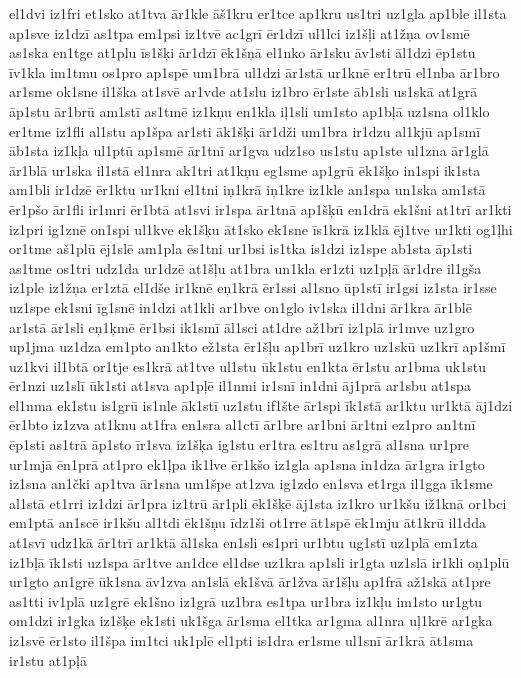 {el1dvi
iz1fri
et1sko
at1tva
ār1kle
āš1kru
er1tce
ap1kru
us1tri
uz1gla
ap1ble
il1sta
ap1sve
iz1dzī
as1tpa
em1psi
iz1tvē
ac1grī
ēr1dzī
ul1lci
iz1šļi
at1žņa
ov1smē
as1ska
en1tge
at1plu
īs1šķi
ār1dzī
ēk1šņā
el1nko
ār1sku
āv1sti
āl1dzi
ēp1stu
īv1kla
im1tmu
os1pro
ap1spē
um1brā
ul1dzi
ār1stā
ur1knē
er1trū
el1nba
ār1bro
ar1sme
ok1sne
il1ška
at1svē
ar1vde
at1slu
iz1bro
ēr1ste
āb1sli
us1skā
at1grā
āp1stu
ār1brū
am1stī
as1tmē
iz1kņu
en1kla
iļ1sli
um1sto
ap1bļā
uz1sna
ol1klo
er1tme
iz1fli
al1stu
ap1špa
ar1sti
āk1šķi
ār1dži
um1bra
ir1dzu
al1kjū
ap1smī
āb1sta
iz1kļa
ul1ptū
ap1smē
ār1tnī
ar1gva
udz1so
us1stu
ap1ste
ul1zna
ār1glā
ār1blā
ur1ska
il1stā
el1nra
ak1tri
at1kņu
eg1sme
ap1grū
ēk1šķo
in1spi
ik1sta
am1bli
ir1dzē
ēr1ktu
ur1kni
el1tni
iņ1krā
iņ1kre
iz1kle
an1spa
un1ska
am1stā
ēr1pšo
ār1fli
ir1mri
ēr1btā
at1svi
ir1spa
ār1tnā
ap1šķū
en1drā
ek1šni
at1trī
ar1kti
iz1pri
ig1znē
on1spi
ul1kve
ek1šķu
āt1sko
ek1sne
īs1krā
iz1klā
ēj1tve
ur1kti
og1ļhi
or1tme
aš1plū
ēj1slē
am1pla
ēs1tni
ur1bsi
is1tka
is1dzi
iz1spe
ab1sta
āp1sti
as1tme
os1tri
udz1da
ur1dzē
at1šļu
at1bra
un1kla
er1zti
uz1pļā
ār1dre
il1gša
iz1ple
iz1žņa
er1ztā
el1dše
ir1knē
eņ1krā
ēr1ssi
al1sno
ūp1stī
ir1gsi
iz1sta
ir1sse
uz1spe
ek1sni
īg1snē
in1dzi
at1kli
ar1bve
on1glo
iv1ska
il1dni
ār1kra
ār1blē
ar1stā
ār1sli
eņ1ķmē
ēr1bsi
ik1smī
āl1sci
at1dre
až1brī
iz1plā
ir1mve
uz1gro
up1jma
uz1dza
em1pto
an1kto
ež1sta
ēr1šļu
ap1brī
uz1kro
uz1skū
uz1krī
ap1šmī
uz1kvi
il1btā
or1tje
es1krā
at1tve
ul1stu
ūk1stu
en1kta
ēr1stu
ar1bma
uk1stu
ēr1nzi
uz1slī
ūk1sti
at1sva
ap1pļē
il1nmi
ir1snī
in1dni
āj1prā
ar1sbu
at1spa
el1nma
ek1stu
is1grū
is1nle
āk1stī
uz1stu
if1šte
ār1spi
īk1stā
ar1ktu
ur1ktā
āj1dzi
ēr1bto
iz1zva
at1knu
at1fra
en1sra
al1ctī
ār1bre
ar1bni
ār1tni
ez1pro
an1tnī
ēp1sti
as1trā
āp1sto
īr1sva
iz1šķa
ig1stu
er1tra
es1tru
as1grā
al1sna
ur1pre
ur1mjā
ēn1prā
at1pro
ek1ļpa
ik1lve
ēr1kšo
iz1gla
ap1sna
in1dza
ār1gra
ir1gto
iz1sna
an1čki
ap1tva
ār1sna
um1špe
at1zva
ig1zdo
en1sva
et1rga
il1gga
īk1sme
al1stā
et1rri
iz1dzi
ār1pra
iz1trū
ār1pli
ēk1šķē
āj1sta
iz1kro
ur1kšu
iž1knā
or1bci
em1ptā
an1scē
ir1kšu
al1tdi
ēk1šņu
īdz1ši
ot1rre
āt1spē
ēk1mju
āt1krū
il1dda
at1svī
udz1kā
ār1trī
ar1ktā
āl1ska
en1sli
es1pri
ur1btu
ug1stī
uz1plā
em1zta
iz1bļā
īk1sti
uz1spa
ār1tve
an1dce
el1dse
uz1kra
ap1sli
ir1gta
uz1slā
ir1kli
oņ1plū
ur1gto
an1grē
ūk1sna
āv1zva
an1slā
ek1švā
ār1žva
ār1šļu
ap1frā
až1skā
at1pre
as1tti
iv1plā
uz1grē
ek1šno
iz1grā
uz1bra
es1tpa
ur1bra
iz1kļu
im1sto
ur1gtu
om1dzi
ir1gka
iz1šķe
ek1sti
uk1šga
ār1sma
el1tka
ar1gma
al1nra
uļ1krē
ar1gka
iz1svē
ēr1sto
il1špa
im1tci
uk1plē
el1pti
is1dra
er1sme
ul1snī
ār1krā
āt1sma
ir1stu
at1pļā
}
